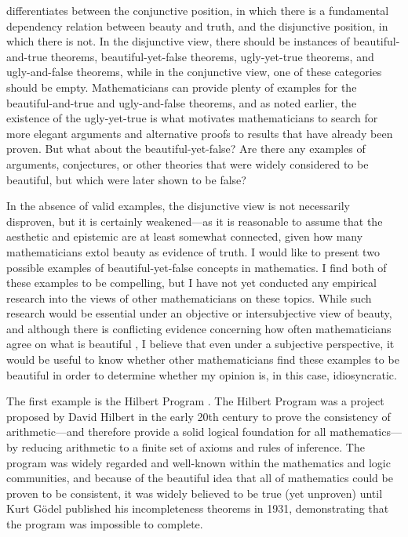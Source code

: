\documentclass[a4paper,man,natbib]{apa6}
\begin{document}
\cite{todd_unmasking_2008} differentiates between the conjunctive position, in which there is a fundamental dependency
relation between beauty and truth, and the disjunctive position, in which there is not. 
In the disjunctive view, there should be 
instances of beautiful-and-true theorems, beautiful-yet-false theorems, ugly-yet-true theorems, and ugly-and-false theorems,
while in the conjunctive view, one of these categories should be empty. 
Mathematicians can provide plenty of examples for the beautiful-and-true \citep{aigner1999proofs} and
ugly-and-false theorems, and as noted earlier, the existence of the ugly-yet-true is what motivates mathematicians
to search for more elegant arguments and alternative proofs to results that have already been proven. But what about
the beautiful-yet-false? Are there any examples of arguments, conjectures, or other theories that were widely considered 
to be beautiful, but which were later shown to be false?

In the absence of valid examples, the disjunctive view is not necessarily disproven, but it is certainly weakened---as
it is reasonable to assume that the aesthetic and epistemic are at least somewhat connected, given how many 
mathematicians extol beauty as evidence of truth. I would like to present two possible examples of beautiful-yet-false
concepts in mathematics.
I find both of these examples to be compelling, but I have not yet conducted any empirical research into the views
of other mathematicians on these topics. While such research would be essential under an objective or intersubjective
view of beauty, and although there is conflicting evidence concerning how often mathematicians agree on
what is beautiful \citep{larvor_diversity_2016,sa_mathematicians_2023,inglis_are_2020}, 
I believe that even under a subjective perspective, it would be useful to know whether other mathematicians
find these examples to be beautiful in order to determine whether my opinion is, in this case, idiosyncratic.

The first example is the Hilbert Program \citep{sep-hilbert-program}. The Hilbert Program was a project proposed by 
David Hilbert in the early 20th century to prove the consistency of arithmetic---and therefore provide a solid 
logical foundation for all mathematics---by reducing 
arithmetic to a finite set of axioms and rules of inference. The program was widely regarded and well-known within
the mathematics and logic communities, and because of the beautiful idea that all of mathematics could be proven
to be consistent, it was widely believed to be true (yet unproven) until Kurt Gödel published his incompleteness
theorems in 1931, demonstrating that the program was impossible to complete.
\end{document}

